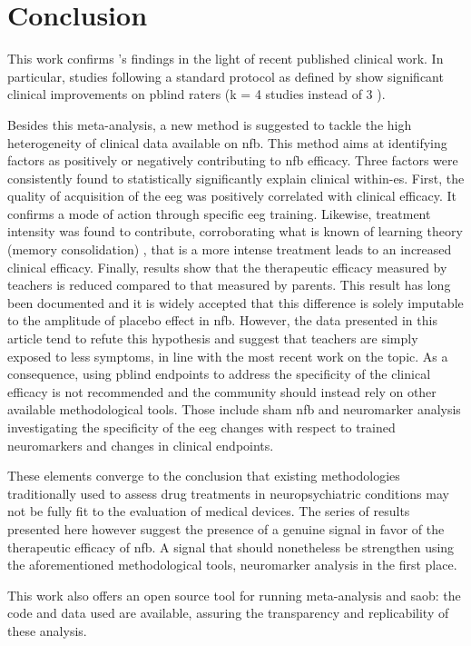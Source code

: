 

\section{Conclusion}


This work confirms \citet{Cortese2016}'s findings in the light of recent published clinical work.
In particular, studies following a standard protocol as defined by \citet{Arns2014} show significant 
clinical improvements on \gls{pblind} raters (k = 4 studies instead of 3 \citet{Cortese2016}).

Besides this meta-analysis, a new method is suggested to tackle the high heterogeneity of clinical data 
available on \gls{nfb}. This method aims at identifying factors as positively or negatively contributing 
to \gls{nfb} efficacy. Three factors were consistently found to statistically significantly explain clinical 
within-\gls{es}. First, the quality of acquisition of the \gls{eeg} was positively correlated with clinical 
efficacy. It confirms a mode of action through specific \gls{eeg} training. Likewise, treatment intensity was 
found to contribute, corroborating what is known of learning theory (memory consolidation) \citep{Mowrer1960}, 
that is a more intense treatment leads to an increased clinical efficacy. Finally, results show that the therapeutic 
efficacy measured by teachers is reduced compared to that measured by parents. This result has long been documented 
and it is widely accepted that this difference is solely imputable to the amplitude of placebo effect in \gls{nfb}. 
However, the data presented in this article tend to refute this hypothesis and suggest that teachers are simply 
exposed to less symptoms, in line with the most recent work on the topic. As a consequence, using \gls{pblind} 
endpoints to address the specificity of the clinical efficacy is not recommended and the community should instead 
rely on other available methodological tools. Those include sham \gls{nfb} and neuromarker analysis investigating 
the specificity of the \gls{eeg} changes with respect to trained neuromarkers and changes in clinical endpoints.

These elements converge to the conclusion that existing methodologies traditionally used to assess drug treatments 
in neuropsychiatric conditions may not be fully fit to the evaluation of medical devices. The series of results presented 
here however suggest the presence of a genuine signal in favor of the therapeutic efficacy of \gls{nfb}. A signal that 
should nonetheless be strengthen using the aforementioned methodological tools, neuromarker analysis in the first place.

This work also offers an open source tool for running meta-analysis and \gls{saob}: the code and data used are available, 
assuring the transparency and replicability of these analysis. 

